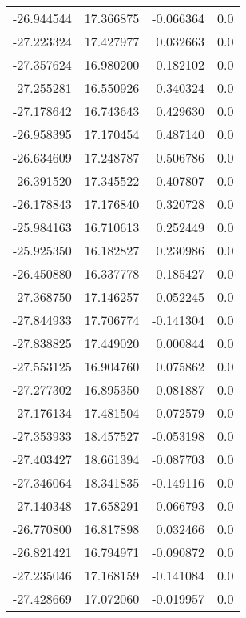 \begin{tabular}{rrrr}
      -26.944544 &        17.366875 &   -0.066364 &   0.0 \\
      -27.223324 &        17.427977 &    0.032663 &   0.0 \\
      -27.357624 &        16.980200 &    0.182102 &   0.0 \\
      -27.255281 &        16.550926 &    0.340324 &   0.0 \\
      -27.178642 &        16.743643 &    0.429630 &   0.0 \\
      -26.958395 &        17.170454 &    0.487140 &   0.0 \\
      -26.634609 &        17.248787 &    0.506786 &   0.0 \\
      -26.391520 &        17.345522 &    0.407807 &   0.0 \\
      -26.178843 &        17.176840 &    0.320728 &   0.0 \\
      -25.984163 &        16.710613 &    0.252449 &   0.0 \\
      -25.925350 &        16.182827 &    0.230986 &   0.0 \\
      -26.450880 &        16.337778 &    0.185427 &   0.0 \\
      -27.368750 &        17.146257 &   -0.052245 &   0.0 \\
      -27.844933 &        17.706774 &   -0.141304 &   0.0 \\
      -27.838825 &        17.449020 &    0.000844 &   0.0 \\
      -27.553125 &        16.904760 &    0.075862 &   0.0 \\
      -27.277302 &        16.895350 &    0.081887 &   0.0 \\
      -27.176134 &        17.481504 &    0.072579 &   0.0 \\
      -27.353933 &        18.457527 &   -0.053198 &   0.0 \\
      -27.403427 &        18.661394 &   -0.087703 &   0.0 \\
      -27.346064 &        18.341835 &   -0.149116 &   0.0 \\
      -27.140348 &        17.658291 &   -0.066793 &   0.0 \\
      -26.770800 &        16.817898 &    0.032466 &   0.0 \\
      -26.821421 &        16.794971 &   -0.090872 &   0.0 \\
      -27.235046 &        17.168159 &   -0.141084 &   0.0 \\
      -27.428669 &        17.072060 &   -0.019957 &   0.0 \\

\end{tabular}
